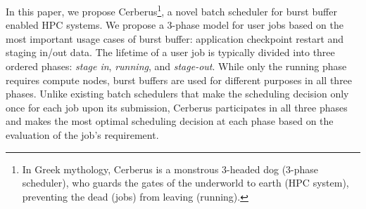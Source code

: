 In this paper, we propose Cerberus\footnote{In Greek mythology,
Cerberus is a monstrous 3-headed dog (3-phase scheduler),
who guards the gates of the underworld to earth (HPC system),
preventing the dead (jobs) from leaving (running).},
a novel batch scheduler for burst buffer enabled HPC systems. 
We propose a 3-phase model for user jobs
based on the most important usage cases of burst buffer: 
application checkpoint restart and staging in/out data. 
The lifetime of a user job is typically divided into three ordered phases:
\textit{stage in}, \textit{running}, and \textit{stage-out}.
While only the running phase requires compute nodes, burst buffers are used for different
purposes in all three phases.
Unlike existing batch schedulers that 
make the scheduling decision only once for each job upon its submission, 
Cerberus participates in all three phases and makes the most optimal
scheduling decision at each phase based on the evaluation of the job's requirement.

